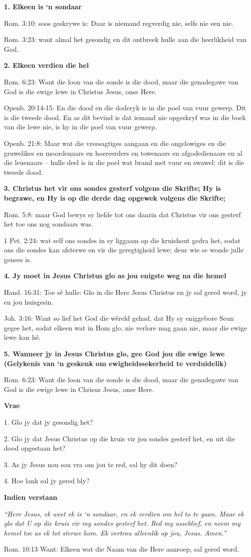 \textbf{1. Elkeen is ‘n sondaar}

Rom. 3:10: soos geskrywe is: Daar is niemand regverdig nie, selfs nie een nie.

Rom. 3:23: want almal het gesondig en dit ontbreek hulle aan die heerlikheid van God.

\textbf{2. Elkeen verdien die hel}

Rom. 6:23: Want die loon van die sonde is die dood, maar die genadegawe van God is die ewige lewe in Christus Jesus, onse Here.

Openb. 20:14-15: En die dood en die doderyk is in die poel van vuur gewerp. Dit is die tweede dood.  En as dit bevind is dat iemand nie opgeskryf was in die boek van die lewe nie, is hy in die poel van vuur gewerp.

Openb. 21:8: Maar wat die vreesagtiges aangaan en die ongelowiges en die gruwelikes en moordenaars en hoereerders en towenaars en afgodedienaars en al die leuenaars – hulle deel is in die poel wat brand met vuur en swawel: dit is die tweede dood.
       
\textbf{3. Christus het vir ons sondes gesterf volgens die Skrifte; Hy is begrawe, en Hy is op die derde dag opgewek volgens die Skrifte;}

Rom. 5:8: maar God bewys sy liefde tot ons daarin dat Christus vir ons gesterf het toe ons nog sondaars was.

1 Pet. 2:24: wat self ons sondes in sy liggaam op die kruishout gedra het, sodat ons die sondes kan afsterwe en vir die geregtigheid lewe; deur wie se wonde julle genees is.

\textbf{4. Jy moet in Jesus Christus glo as jou enigste weg na die hemel}

Hand. 16:31: Toe sê hulle: Glo in die Here Jesus Christus en jy sal gered word, jy en jou huisgesin.

Joh. 3:16: Want so lief het God die wêreld gehad, dat Hy sy eniggebore Seun gegee het, sodat elkeen wat in Hom glo, nie verlore mag gaan nie, maar die ewige lewe kan hê.

\textbf{5. Wanneer jy in Jesus Christus glo, gee God jou die ewige lewe (Gelykenis van ‘n geskenk om ewigheids­sekerheid te verduidelik)}

Rom. 6:23: Want die loon van die sonde is die dood, maar die genadegawe van God is die ewige lewe in Chrisus Jesus, onse Here.

\textbf{Vrae}

  1. Glo jy dat jy gesondig het?

  2. Glo jy dat Jesus Christus op die kruis vir jou sondes gesterf het, en uit die dood opgestaan het?

  3. As jy Jesus nou sou vra om jou te red, sal hy dit doen?

  4. Hoe lank sal jy gered bly?


\textbf{Indien verstaan}

{\em “Here Jesus, ek weet ek is ‘n sondaar, en ek verdien om hel to te gaan.  Maar ek glo dat U op die kruis vir my sondes gesterf het.  Red my asseblief, en neem my hemel toe as ek tot sterwe kom.  Ek vertrou alleenlik op jou, Jesus.  Amen.” }

Rom. 10:13 Want: Elkeen wat die Naam van die Here aanroep, sal gered word.

